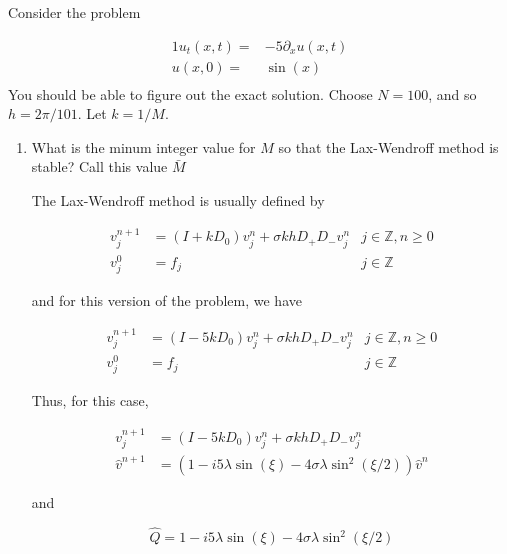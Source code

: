 \documentclass[11pt]{amsart}
\numberwithin{equation}{section}
\begin{document}
\newpage
{}

Consider the problem

\begin{alignat*}{1}
    u_t(x,t)= & -5 \partial_x u(x,t) \\
    u(x,0)=   & \sin(x)              \\
\end{alignat*}
You should be able to figure out  the exact solution. Choose $N=100$, and so $h=2 \pi/101$. Let $k=1/M$.

\begin{enumerate}
    \item What is the minum integer value for $M$ so that the Lax-Wendroff method is stable? Call this value $\bar{M}$ \\
          
          {\color{blue}
          
          The Lax-Wendroff method is usually defined by
          
          \begin{align}
              v_j^{n+1} & = (I + kD_0)v_j^n + \sigma k h D_+ D_- v_j^n & j \in \mathbb Z, n \ge 0 \\
              v_j^0     & = f_j                                        & j \in \mathbb Z
          \end{align}
          
          and for this version of the problem, we have
          
          \begin{align}
              v_j^{n+1} & = (I - 5kD_0)v_j^n + \sigma k h D_+ D_- v_j^n & j \in \mathbb Z, n \ge 0 \\
              v_j^0     & = f_j                                         & j \in \mathbb Z
          \end{align}
          
          Thus, for this case, 
          
          \begin{align}
              v_j^{n+1}      & = (I - 5kD_0)v_j^n + \sigma k h D_+ D_- v_j^n                          \\
              \hat v^{n + 1} & = (1 - i5\lambda \sin(\xi) - 4\sigma \lambda \sin^2(\xi / 2)) \hat v^n
          \end{align}
          
          and
          
          \begin{equation}
              \hat Q = 1 - i5\lambda \sin(\xi) - 4\sigma \lambda \sin^2(\xi / 2)
          \end{equation}
          
}
\end{enumerate}
\end{document}
